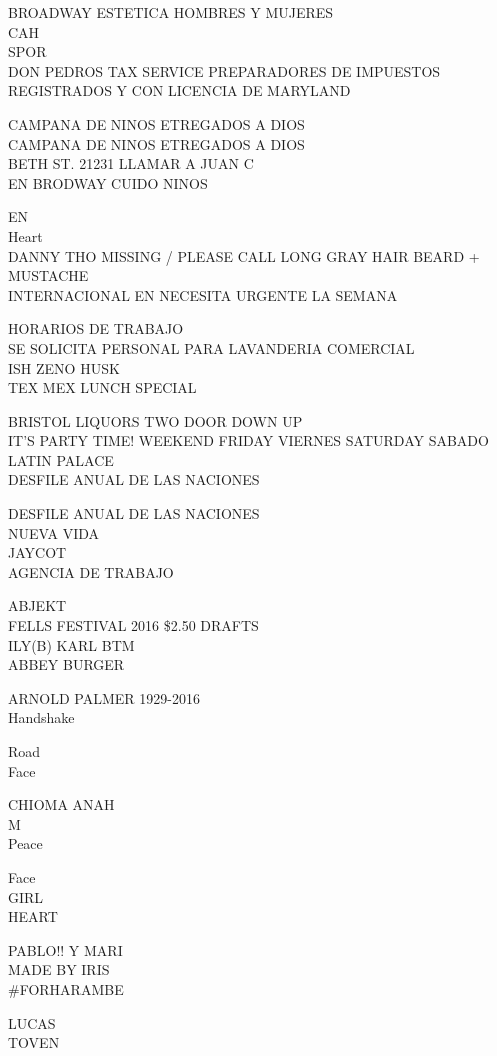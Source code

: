 \documentclass[10pt,letterpaper]{article}
\begin{document}
BROADWAY ESTETICA HOMBRES Y MUJERES\\
CAH\\
SPOR\\
DON PEDROS TAX SERVICE PREPARADORES DE IMPUESTOS REGISTRADOS Y CON LICENCIA DE MARYLAND

CAMPANA DE NINOS ETREGADOS A DIOS\\
CAMPANA DE NINOS ETREGADOS A DIOS\\
BETH ST. 21231 LLAMAR A JUAN C\\
EN BRODWAY CUIDO NINOS

EN\\
Heart\\
DANNY THO MISSING / PLEASE CALL LONG GRAY HAIR BEARD + MUSTACHE\\
INTERNACIONAL EN NECESITA URGENTE LA SEMANA

HORARIOS DE TRABAJO\\
SE SOLICITA PERSONAL PARA LAVANDERIA COMERCIAL\\
ISH ZENO HUSK\\
TEX MEX LUNCH SPECIAL

BRISTOL LIQUORS TWO DOOR DOWN UP\\
IT'S PARTY TIME!  WEEKEND FRIDAY VIERNES SATURDAY SABADO\\
LATIN PALACE\\
DESFILE ANUAL DE LAS NACIONES

DESFILE ANUAL DE LAS NACIONES\\
NUEVA VIDA\\
JAYCOT\\
AGENCIA DE TRABAJO

ABJEKT\\
FELLS FESTIVAL 2016 \$2.50 DRAFTS\\
ILY(B) KARL BTM\\
ABBEY BURGER

ARNOLD PALMER 1929{-}2016\\
Handshake

Road\\
Face

CHIOMA ANAH\\
M\\
Peace

Face\\
GIRL\\
HEART

PABLO!! Y MARI\\
MADE BY IRIS\\
\#FORHARAMBE

LUCAS\\
TOVEN
\end{document}
